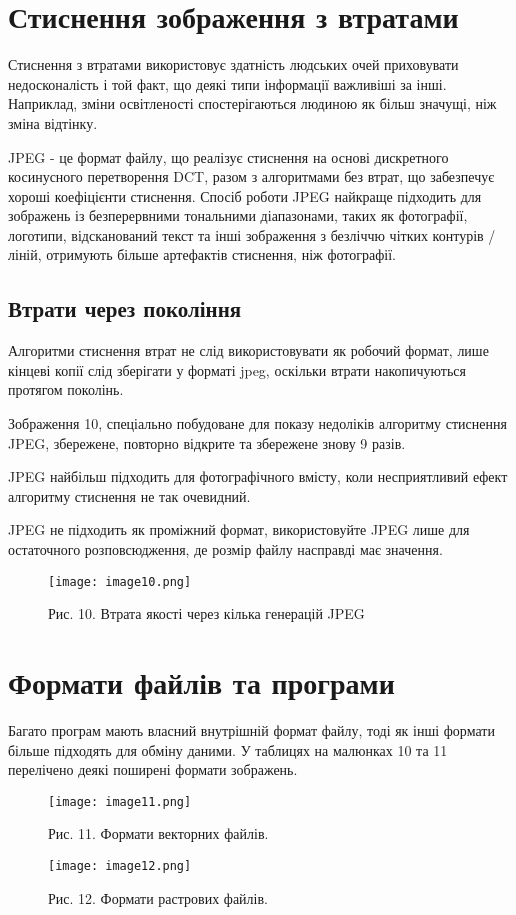 \section{Стиснення зображення з втратами}\label{sec:lossy_image_compression}
Стиснення з втратами використовує здатність людських очей приховувати недосконалість і той факт, що деякі типи інформації важливіші за інші.
Наприклад, зміни освітленості спостерігаються людиною як більш значущі, ніж зміна відтінку.

JPEG - це формат файлу, що реалізує стиснення на основі дискретного косинусного перетворення DCT, разом з алгоритмами без втрат, що забезпечує хороші коефіцієнти стиснення.
Спосіб роботи JPEG найкраще підходить для зображень із безперервними тональними діапазонами, таких як фотографії, логотипи, відсканований текст та інші зображення з безліччю чітких контурів / ліній, отримують більше артефактів стиснення, ніж фотографії.

\subsection{Втрати через покоління}\label{sec:loss_through_generations}
Алгоритми стиснення втрат не слід використовувати як робочий формат, лише кінцеві копії слід зберігати у форматі jpeg, оскільки втрати накопичуються протягом поколінь.

Зображення 10, спеціально побудоване для показу недоліків алгоритму стиснення JPEG, збережене, повторно відкрите та збережене знову 9 разів.

JPEG найбільш підходить для фотографічного вмісту, коли несприятливий ефект алгоритму стиснення не так очевидний.

JPEG не підходить як проміжний формат, використовуйте JPEG лише для остаточного розповсюдження, де розмір файлу насправді має значення.

\begin{figure}
    \label{fig:image10}
    \centering
    \texttt{[image: image10.png]}

    Рис. 10. Втрата якості через кілька генерацій JPEG
\end{figure}


\section{Формати файлів та програми}\label{sec:image_formats}
Багато програм мають власний внутрішній формат файлу, тоді як інші формати більше підходять для обміну даними.
У таблицях на малюнках 10 та 11 перелічено деякі поширені формати зображень.

\begin{figure}
    \label{fig:image11}
    \centering
    \texttt{[image: image11.png]}

    Рис. 11. Формати векторних файлів.
\end{figure}

\begin{figure}
    \label{fig:image12}
    \centering
    \texttt{[image: image12.png]}

    Рис. 12. Формати растрових файлів.
\end{figure}
